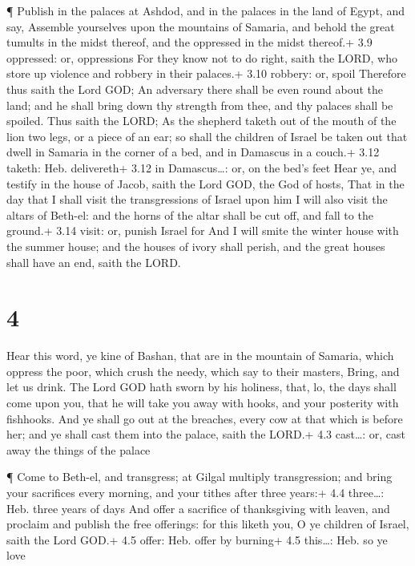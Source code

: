  ¶ Publish in the palaces at Ashdod, and in the palaces in
the land of Egypt, and say, Assemble yourselves upon the mountains of
Samaria, and behold the great tumults in the midst thereof, and the
oppressed in the midst thereof.+ 3.9 oppressed: or, oppressions
 For they know not to do right, saith the LORD, who store
up violence and robbery in their palaces.+ 3.10 robbery: or, spoil
 Therefore thus saith the Lord GOD; An adversary there
shall be even round about the land; and he shall bring down thy strength
from thee, and thy palaces shall be spoiled.  Thus saith
the LORD; As the shepherd taketh out of the mouth of the lion two legs,
or a piece of an ear; so shall the children of Israel be taken out that
dwell in Samaria in the corner of a bed, and in Damascus in a couch.+
3.12 taketh: Heb. delivereth+ 3.12 in Damascus\ldots: or, on the bed's
feet  Hear ye, and testify in the house of Jacob, saith the
Lord GOD, the God of hosts,  That in the day that I shall
visit the transgressions of Israel upon him I will also visit the altars
of Beth-el: and the horns of the altar shall be cut off, and fall to the
ground.+ 3.14 visit: or, punish Israel for  And I will
smite the winter house with the summer house; and the houses of ivory
shall perish, and the great houses shall have an end, saith the LORD.

\hypertarget{section-3}{%
\section{4}\label{section-3}}

 Hear this word, ye kine of Bashan, that are in the mountain
of Samaria, which oppress the poor, which crush the needy, which say to
their masters, Bring, and let us drink.  The Lord GOD hath
sworn by his holiness, that, lo, the days shall come upon you, that he
will take you away with hooks, and your posterity with fishhooks.
 And ye shall go out at the breaches, every cow at that
which is before her; and ye shall cast them into the palace, saith the
LORD.+ 4.3 cast\ldots: or, cast away the things of the palace

 ¶ Come to Beth-el, and transgress; at Gilgal multiply
transgression; and bring your sacrifices every morning, and your tithes
after three years:+ 4.4 three\ldots: Heb. three years of days
 And offer a sacrifice of thanksgiving with leaven, and
proclaim and publish the free offerings: for this liketh you, O ye
children of Israel, saith the Lord GOD.+ 4.5 offer: Heb. offer by
burning+ 4.5 this\ldots: Heb. so ye love

